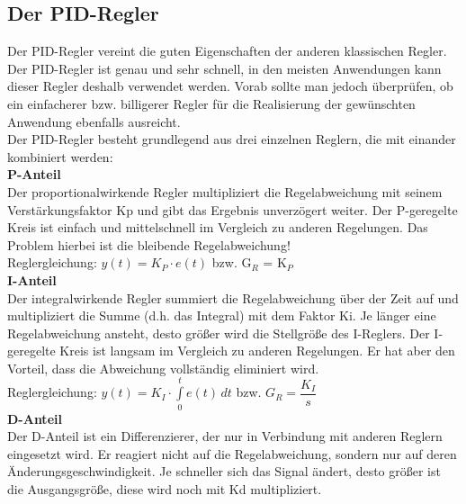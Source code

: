 \newpage

\subsection{Der PID-Regler}
Der PID-Regler vereint die guten Eigenschaften der anderen klassischen Regler. Der PID-Regler ist genau und sehr schnell, in den meisten Anwendungen kann dieser Regler deshalb verwendet werden. Vorab sollte man jedoch überprüfen, ob ein einfacherer bzw. billigerer Regler für die Realisierung der gewünschten Anwendung ebenfalls ausreicht.
\\[5mm]
Der PID-Regler besteht grundlegend aus drei einzelnen Reglern, die mit einander kombiniert werden:
\\[5mm]
\textbf{P-Anteil}\\[1mm]
Der proportionalwirkende Regler multipliziert die Regelabweichung mit seinem Verstärkungsfaktor Kp und gibt das Ergebnis unverzögert weiter. Der P-geregelte Kreis ist einfach und mittelschnell im Vergleich zu anderen Regelungen. Das Problem hierbei ist die bleibende Regelabweichung!
\\[4mm]
Reglergleichung: \hspace{5mm} $y(t) = K_P \cdot e(t)$ \hspace{5mm} bzw. \hspace{5mm} G$_R$ = K$_P$
\\[7mm]

\textbf{I-Anteil}\\[1mm]
Der integralwirkende Regler summiert die Regelabweichung über der Zeit auf und multipliziert die Summe (d.h. das Integral) mit dem Faktor Ki. Je länger eine Regelabweichung ansteht, desto größer wird die Stellgröße des I-Reglers. Der I-geregelte Kreis ist langsam im Vergleich zu anderen Regelungen. Er hat aber den Vorteil, dass die Abweichung vollständig eliminiert wird.
\\[4mm]
Reglergleichung: \hspace{5mm} $y(t) = K_I \cdot \int\limits_{0}^{t} e(t) \,dt$ \hspace{5mm} bzw. \hspace{5mm} $G_R = \dfrac{K_I}{s}$
\\[7mm]

\textbf{D-Anteil}\\[1mm]
Der D-Anteil ist ein Differenzierer, der nur in Verbindung mit anderen Reglern eingesetzt wird. Er reagiert nicht auf die Regelabweichung, sondern nur auf deren Änderungsgeschwindigkeit. Je schneller sich das Signal ändert, desto größer ist die Ausgangsgröße, diese wird noch mit Kd multipliziert.

